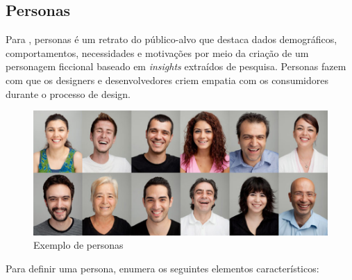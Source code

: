 \subsection{Personas}

Para , personas é  um retrato do público-alvo que destaca dados demográficos, comportamentos,
necessidades e motivações por meio da criação de um personagem ficcional
baseado em \textit{insights} extraídos de pesquisa. Personas fazem com que os designers e desenvolvedores criem empatia com os consumidores durante o processo de design.

\begin{figure}[H]
	\centering
	\includegraphics[scale=0.4]{imagens/personas-marketing.png}
	\caption{Exemplo de personas}
\end{figure}

Para definir uma persona,  enumera os seguintes elementos característicos:

